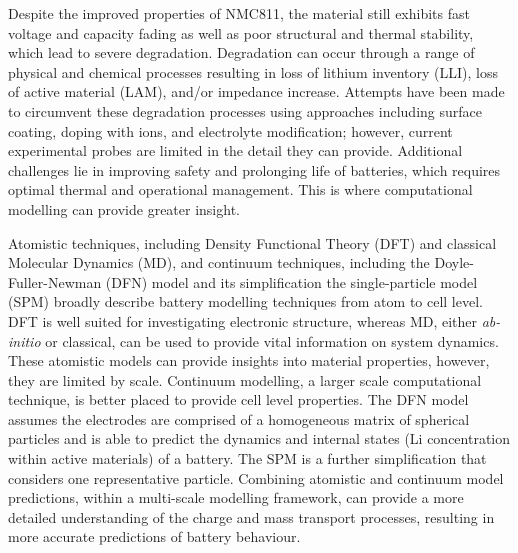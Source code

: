 \documentclass[journal=jacsat,manuscript=article]{achemso}
\begin{document}
Despite the improved properties of NMC811, the material still exhibits fast voltage and capacity fading as well as poor structural and thermal stability\cite{noh2013comparison,Li-aenm-2019,Jerng-ACS-AMI-2020}, which lead to severe degradation. \cite{Zhang-acs.chemmater-2019,Feng-2019,Xia2018,De-AdMat-2019,Li_Nat-Comm-2017,Manthiram-NatComm-2020} Degradation can occur through a range of physical and chemical processes resulting in loss of lithium inventory (LLI), loss of active material (LAM), and/or impedance increase.\cite{vetter2005ageing} 
Attempts have been made to circumvent these degradation processes using approaches including surface coating, doping with ions, and electrolyte modification;\cite{maleki2019controllable,Liu-JSSE-2020} however, current experimental probes are limited in the detail they can provide. 
Additional challenges lie in improving safety and prolonging life of batteries, which requires optimal thermal and operational management. 
This is where computational modelling can provide greater insight.

Atomistic techniques, including Density Functional Theory (DFT) and classical Molecular Dynamics (MD), and continuum techniques, including the Doyle-Fuller-Newman (DFN) model and its simplification the single-particle model (SPM) \cite{Newman1975porous, Doyle1993DFN} broadly describe battery modelling techniques from atom to cell level. \cite{Howey_2020} 
DFT is well suited for investigating electronic structure, whereas MD, either \textit{ab-initio} or classical, can be used to provide vital information on system dynamics. These atomistic models can provide insights into material properties, however, they are limited by scale. 
Continuum modelling, a larger scale computational technique, is better placed to provide cell level properties. 
The DFN model assumes the electrodes are comprised of a homogeneous matrix of spherical particles and is able to predict the dynamics and internal states (Li concentration within active materials) of a battery. The SPM is a further simplification that considers one representative particle.
Combining atomistic and continuum model predictions, within a multi-scale modelling framework, can provide a more detailed understanding of the charge and mass transport processes, resulting in more accurate predictions of battery behaviour.
\end{document}
